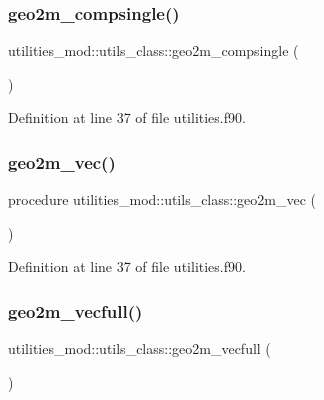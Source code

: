\subsubsection{\texorpdfstring{geo2m\+\_\+compsingle()}{geo2m\_compsingle()}}
{\footnotesize\ttfamily utilities\+\_\+mod\+::utils\+\_\+class\+::geo2m\+\_\+compsingle (\begin{DoxyParamCaption}{ }\end{DoxyParamCaption})\hspace{0.3cm}{\ttfamily [private]}}



Definition at line 37 of file utilities.\+f90.

\mbox{\label{structutilities__mod_1_1utils__class_a37ba4d9fc1c6ef99561627f05c82cf7e}} 
\subsubsection{\texorpdfstring{geo2m\+\_\+vec()}{geo2m\_vec()}}
{\footnotesize\ttfamily procedure utilities\+\_\+mod\+::utils\+\_\+class\+::geo2m\+\_\+vec (\begin{DoxyParamCaption}{ }\end{DoxyParamCaption})\hspace{0.3cm}{\ttfamily [private]}}



Definition at line 37 of file utilities.\+f90.

\mbox{\label{structutilities__mod_1_1utils__class_a127b95b7b59811e93f88796c5dc6f6ce}} 
\subsubsection{\texorpdfstring{geo2m\+\_\+vecfull()}{geo2m\_vecfull()}}
{\footnotesize\ttfamily utilities\+\_\+mod\+::utils\+\_\+class\+::geo2m\+\_\+vecfull (\begin{DoxyParamCaption}{ }\end{DoxyParamCaption})\hspace{0.3cm}{\ttfamily [private]}}



